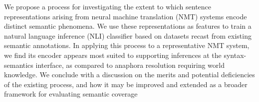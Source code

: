 We propose a process for investigating the extent to which sentence representations arising from neural machine translation (NMT) systems encode distinct semantic phenomena. We use these representations as features to train a natural language inference (NLI) classifier based on datasets recast from existing semantic annotations. In applying this process to a representative NMT system, we find its encoder appears most suited to supporting inferences at the syntax-semantics interface, as compared to anaphora resolution requiring world knowledge. We conclude with a discussion on the merits and potential deficiencies of the existing process, and how it may be improved and extended as a broader framework for evaluating semantic coverage
